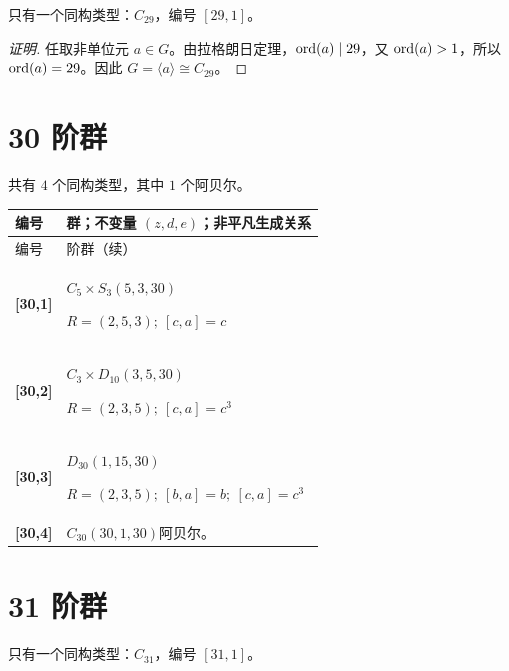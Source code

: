 \documentclass[UTF8,fontset=fandol,11pt,a4paper]{ctexart}
\begin{document}
只有一个同构类型：$C_{29}$，编号 $[29,1]$。

\begin{proof}[证明]
任取非单位元 $a\in G$。由拉格朗日定理，$\operatorname{ord}(a)\mid 29$，又 $\operatorname{ord}(a)>1$，所以 $\operatorname{ord}(a)=29$。因此 $G=\langle a\rangle\cong C_{29}$。
\end{proof}

\section*{30 阶群}\label{order:30}

共有 $4$ 个同构类型，其中 $1$ 个阿贝尔。

\begingroup\small\setlength{\tabcolsep}{3pt}\renewcommand{\arraystretch}{1.12}

\begin{longtable}{@{}p{17mm}>{\raggedright\arraybackslash}p{141mm}@{}}

\toprule 编号 & 群；不变量 $(z,d,e)$；非平凡生成关系\\\midrule\endfirsthead

\toprule 编号 & 30 阶群（续）\\\midrule\endhead\bottomrule\endfoot

\textbf{[30,1]} & $C_{5}\times S_{3}$\quad $(5,3,30)$\par\(R=(2,5,3);\allowbreak\ [c,a]=c\)\\[3pt]

\textbf{[30,2]} & $C_{3}\times D_{10}$\quad $(3,5,30)$\par\(R=(2,3,5);\allowbreak\ [c,a]=c^{3}\)\\[3pt]

\textbf{[30,3]} & $D_{30}$\quad $(1,15,30)$\par\(R=(2,3,5);\allowbreak\ [b,a]=b;\allowbreak\ [c,a]=c^{3}\)\\[3pt]

\textbf{[30,4]} & $C_{30}$\quad $(30,1,30)$\quad 阿贝尔。\\[3pt]

\end{longtable}\endgroup

\section*{31 阶群}\label{order:31}

只有一个同构类型：$C_{31}$，编号 $[31,1]$。
\end{document}
